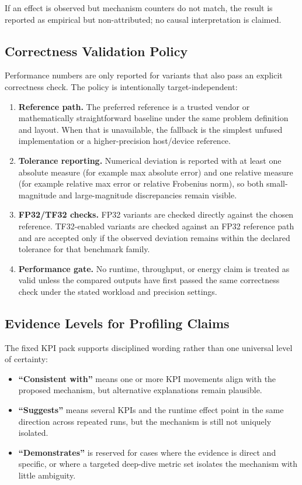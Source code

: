 If an effect is observed but mechanism counters do not match, the result is
reported as empirical but non-attributed; no causal interpretation is claimed.

\subsection{Correctness Validation Policy}

Performance numbers are only reported for variants that also pass an explicit
correctness check. The policy is intentionally target-independent:

\begin{enumerate}
  \item \textbf{Reference path.} The preferred reference is a trusted vendor or
  mathematically straightforward baseline under the same problem definition and
  layout. When that is unavailable, the fallback is the simplest unfused
  implementation or a higher-precision host/device reference.
  \item \textbf{Tolerance reporting.} Numerical deviation is reported with at
  least one absolute measure (for example max absolute error) and one relative
  measure (for example relative max error or relative Frobenius norm), so both
  small-magnitude and large-magnitude discrepancies remain visible.
  \item \textbf{FP32/TF32 checks.} FP32 variants are checked directly against
  the chosen reference. TF32-enabled variants are checked against an FP32
  reference path and are accepted only if the observed deviation remains within
  the declared tolerance for that benchmark family.
  \item \textbf{Performance gate.} No runtime, throughput, or energy claim is
  treated as valid unless the compared outputs have first passed the same
  correctness check under the stated workload and precision settings.
\end{enumerate}

\subsection{Evidence Levels for Profiling Claims}

The fixed KPI pack supports disciplined wording rather than one universal level
of certainty:

\begin{itemize}
  \item \textbf{``Consistent with''} means one or more KPI movements align with
  the proposed mechanism, but alternative explanations remain plausible.
  \item \textbf{``Suggests''} means several KPIs and the runtime effect point in
  the same direction across repeated runs, but the mechanism is still not
  uniquely isolated.
  \item \textbf{``Demonstrates''} is reserved for cases where the evidence is
  direct and specific, or where a targeted deep-dive metric set isolates the
  mechanism with little ambiguity.
\end{itemize}

